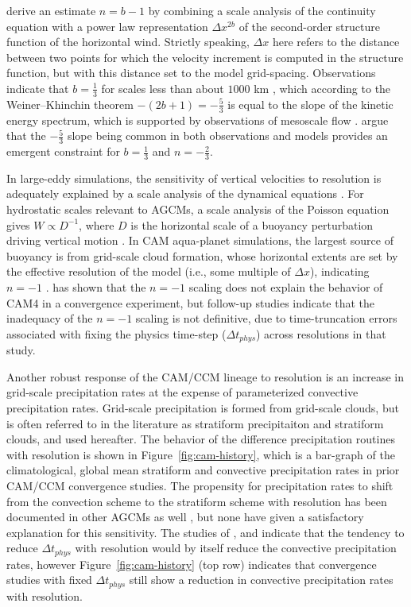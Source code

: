\documentclass[times]{qjrms4}
\begin{document}
\cite{RETAL2016CD} derive an estimate $n= b-1$ by combining a scale analysis of the continuity equation with a power law representation $\Delta x^{2b}$ of the second-order structure function of the horizontal wind. Strictly speaking, $\Delta x$ here refers to the distance between two points for which the velocity increment is computed in the structure function, but with this distance set to the model grid-spacing. Observations indicate that $b=\frac{1}{3}$ for scales less than about $1000$ km \citep{CETAL1999JGR}, which according to the Weiner–Khinchin theorem $- \left( 2b+1 \right) = -\frac{5}{3}$ is equal to the slope of the kinetic energy spectrum, which is supported by observations of mesoscale flow \citep{NG1985JAS}. \cite{RETAL2016CD} argue that the $-\frac{5}{3}$ slope being common in both observations and models provides an emergent constraint for $b=\frac{1}{3}$ and $n= -\frac{2}{3}$.

In large-eddy simulations, the sensitivity of vertical velocities to resolution is adequately explained by a scale analysis of the dynamical equations \citep{WETAL1997MWR,PG2006JAS,JR2016QJRMS}. For hydrostatic scales relevant to AGCMs, a scale analysis of the Poisson equation gives $W \propto D^{-1}$, where $D$ is the horizontal scale of a buoyancy perturbation driving vertical motion \citep{HR2018JAMES}. In CAM aqua-planet simulations, the largest source of buoyancy is from grid-scale cloud formation, whose horizontal extents are set by the effective resolution of the model (i.e., some multiple of $\Delta x$), indicating $n=-1$ \citep{HR2018JAMES}. \cite{HR2017JCLIM} has shown that the $n=-1$ scaling does not explain the behavior of CAM4 in a convergence experiment, but follow-up studies \citep{HR2018JAMES,HETAL2019JAMES} indicate that the inadequacy of the $n=-1$ scaling is not definitive, due to time-truncation errors associated with fixing the physics time-step ($\Delta t_{phys}$) across resolutions in that study.

Another robust response of the CAM/CCM lineage to resolution is an increase in grid-scale precipitation rates at the expense of parameterized convective precipitation rates. Grid-scale precipitation is formed from grid-scale clouds, but is often referred to in the literature as stratiform precipitaiton and stratiform clouds, and used hereafter. The behavior of the difference precipitation routines with resolution is shown in Figure~\ref{fig:cam-history}, which is a bar-graph of the climatological, global mean stratiform and convective precipitation rates in prior CAM/CCM convergence studies. The propensity for precipitation rates to shift from the convection scheme to the stratiform scheme with resolution has been documented in other AGCMs as well \citep{PS2002CD,TETAL2018CD}, but none have given a satisfactory explanation for this sensitivity. The studies of \cite{KW1991JGR}, \cite{WETAL1995CD} and \cite{W2013QJRMS} indicate that the tendency to reduce $\Delta t_{phys}$ with resolution would by itself reduce the convective precipitation rates, however Figure~\ref{fig:cam-history} (top row) indicates that convergence studies with fixed $\Delta t_{phys}$ still show a reduction in convective precipitation rates with resolution.
\end{document}
